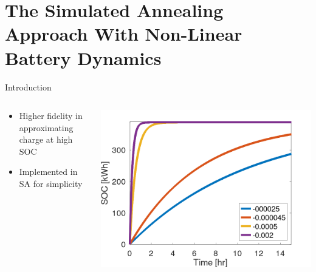 \documentclass[aspectratio=169]{beamer}
\begin{document}
\section{The Simulated Annealing Approach With Non-Linear Battery Dynamics}
\label{sec:orgb94ef6c}
\begin{frame}[label={sec:org07e942c}]{Introduction}
\begin{columns}
\begin{column}{0.3\columnwidth}
\begin{itemize}
\item Higher fidelity in approximating charge at high SOC
\item Implemented in SA for simplicity
\end{itemize}
\end{column}

\begin{column}{0.7\columnwidth}
\begin{center}
\includegraphics[width=.9\linewidth]{./img/nonlinear-bat.png}
\end{center}
\end{column}
\end{columns}
\end{frame}
\end{document}

